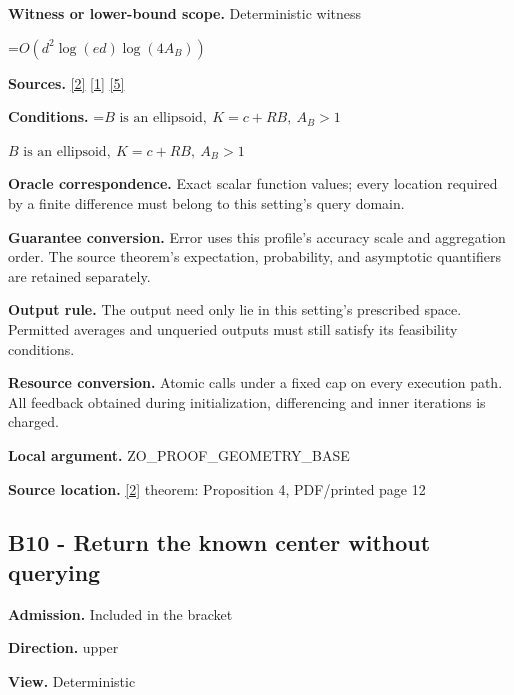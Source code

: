 \documentclass[10pt,a4paper]{article}
\newcommand{\AtlasMath}[1]{\par\begingroup\centering\setbox0=\hbox{$\displaystyle #1$}\ifdim\wd0>1.4\linewidth\typeout{ATLAS WIDE FORMULA: \the\wd0}\fi\ifdim\wd0>\linewidth\resizebox{\linewidth}{!}{\box0}\else\box0\fi\par\endgroup}
\newcommand{\AtlasInlineMath}[1]{\begingroup\setbox0=\hbox{$#1$}\ifdim\wd0>.4\linewidth\endgroup\AtlasMath{#1}\else\endgroup$#1$\fi}
\begin{document}
\textbf{Witness or lower-bound scope.} Deterministic witness



\AtlasMath{O(d^2\log(ed)\log(4A_B))}


\textbf{Sources.} \href{https://arxiv.org/html/2607.16558v2}{[2]} \href{https://arxiv.org/html/2610.00345v1}{[1]} \href{https://www.mathnet.ru/php/archive.phtml?jrnid=mzm&option_lang=eng&paperid=1697&wshow=paper}{[5]}



\textbf{Conditions.} \AtlasInlineMath{B\text{ is an ellipsoid},\ K=c+RB,\ A_B>1}



\textbf{Oracle correspondence.} Exact scalar function values; every location required by a finite difference must belong to this setting's query domain.



\textbf{Guarantee conversion.} Error uses this profile's accuracy scale and aggregation order. The source theorem's expectation, probability, and asymptotic quantifiers are retained separately.



\textbf{Output rule.} The output need only lie in this setting's prescribed space. Permitted averages and unqueried outputs must still satisfy its feasibility conditions.



\textbf{Resource conversion.} Atomic calls under a fixed cap on every execution path. All feedback obtained during initialization, differencing and inner iterations is charged.



\textbf{Local argument.} ZO\_PROOF\_GEOMETRY\_BASE



\textbf{Source location.} \href{https://arxiv.org/html/2607.16558v2}{[2]} theorem: Proposition 4, PDF/printed page 12



\subsection{B10 - Return the known center without querying}


\textbf{Admission.} Included in the bracket



\textbf{Direction.} upper



\textbf{View.} Deterministic
\end{document}
